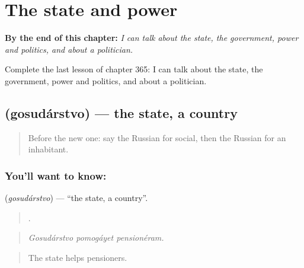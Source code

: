 
\chapter{The state and power}
\label{ch:ru-the-state-and-power}

\begin{chapteropening}
\textbf{By the end of this chapter:} \emph{I can talk about the state, the government, power and politics, and about a politician.}

Complete the last lesson of chapter 365: I can talk about the state, the government, power and politics, and about a politician.
\end{chapteropening}

\section[\texorpdfstring{\ru{государство} (gosudárstvo)}{государство (gosudárstvo)}]{ (gosudárstvo) — the state, a country}

\label{lesson:RU-C365-gosudarstvo}



\begin{quote}
Before the new one: say the Russian for social, then the Russian for an inhabitant.
\end{quote}

\subsection*{You'll want to know: }
\textbf{} (\emph{gosudárstvo}) — \textquotedblleft{}the state, a country\textquotedblright{}.

\begin{quote}
  .
\end{quote}

\begin{quote}
\emph{Gosudárstvo pomogáyet pensionéram.}
\end{quote}

\begin{quote}
The state helps pensioners.
\end{quote}

